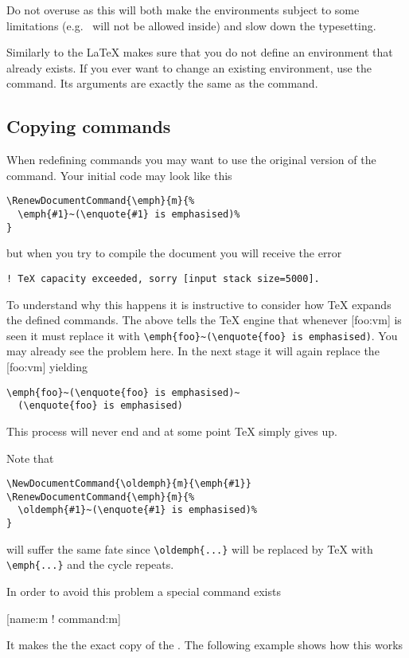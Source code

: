 Do not overuse  as this will both make the environments subject to
some limitations (e.g.\  will not be allowed inside) and slow down the
typesetting.

Similarly to the  \LaTeX{} makes sure that you do not
define an environment that already exists. If you ever want to change an
existing environment, use the  command. Its
arguments are exactly the same as the  command.

\subsection{Copying commands}\label{sec:copyingcommands}

When redefining commands you may want to use the original version of the
command. Your initial code may look like this
\begin{verbatim}
\RenewDocumentCommand{\emph}{m}{%
  \emph{#1}~(\enquote{#1} is emphasised)%
}
\end{verbatim}
but when you try to compile the document you will receive the error
\begin{verbatim}
! TeX capacity exceeded, sorry [input stack size=5000].
\end{verbatim}

To understand why this happens it is instructive to consider how \TeX{} expands
the defined commands. The above  tells the \TeX{}
engine that whenever [foo:vm] is seen it must replace it with
\verb|\emph{foo}~(\enquote{foo} is emphasised)|. You may already see the
problem here. In the next stage it will again replace the [foo:vm]
yielding
\begin{verbatim}
\emph{foo}~(\enquote{foo} is emphasised)~
  (\enquote{foo} is emphasised)
\end{verbatim}
This process will never end and at some point \TeX{}
simply gives up.

Note that
\begin{verbatim}
\NewDocumentCommand{\oldemph}{m}{\emph{#1}}
\RenewDocumentCommand{\emph}{m}{%
  \oldemph{#1}~(\enquote{#1} is emphasised)%
}
\end{verbatim}
will suffer the same fate since \verb|\oldemph{...}| will be replaced by \TeX{}
with \verb|\emph{...}| and the cycle repeats.

In order to avoid this problem a special command exists
\begin{lscommand}
  [\texttt{\bs}name:m ! \texttt{\bs}command:m]
\end{lscommand}
It makes the  the exact copy of the . The following example shows how this works
\begin{example}[examplewidth=0.40\linewidth]

\NewDocumentCommand{\newfoo}{}{\foo}
\NewCommandCopy{\copiedfoo}{\foo}


\foo{} \newfoo{} \copiedfoo{}
\end{example}

